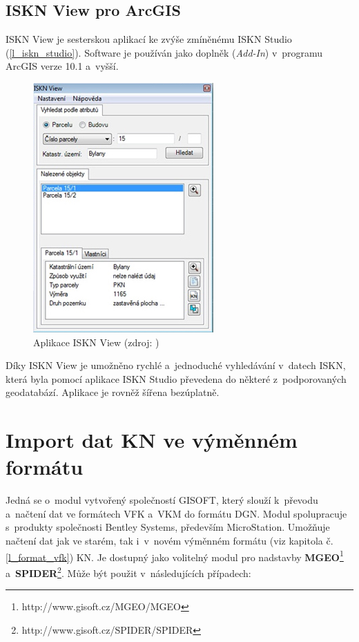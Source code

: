 \documentclass[a4paper,12pt,oneside]{book}
\begin{document}
\newpage
\subsection{ISKN View pro ArcGIS}
ISKN View je sesterskou aplikací ke zvýše zmíněnému ISKN Studio (\ref{l_iskn_studio}). Software je používán jako doplněk (\textit{Add-In}) v~programu ArcGIS verze 10.1 a~vyšší. 

\begin{figure}[htb]
\centering
\includegraphics[scale=0.65]{images/ISKNView-aplikace.png}
\caption[Aplikace ISKN View]{Aplikace ISKN View (zdroj: \cite{iskn_studio})}
\end{figure}

Díky ISKN View je umožněno rychlé a~jednoduché vyhledávání v~datech ISKN, která byla pomocí aplikace ISKN Studio převedena do některé z~podporovaných geodatabází.  Aplikace je rovněž šířena bezúplatně. \cite{iskn_studio}

\newpage
\section{Import dat KN ve výměnném formátu}
Jedná se o~modul vytvořený společností GISOFT, který slouží k~převodu a~načtení dat ve formátech VFK a~VKM do formátu DGN. Modul spolupracuje s~produkty společnosti Bentley Systems, především MicroStation. Umožňuje načtení dat jak ve starém, tak i~v~novém výměnném formátu (viz kapitola č. \ref{l_format_vfk}) KN. Je dostupný jako volitelný modul pro nadstavby \textbf{MGEO}\footnote{http://www.gisoft.cz/MGEO/MGEO} a~\textbf{SPIDER}\footnote{http://www.gisoft.cz/SPIDER/SPIDER}. Může být použit v~následujících případech:
\end{document}
